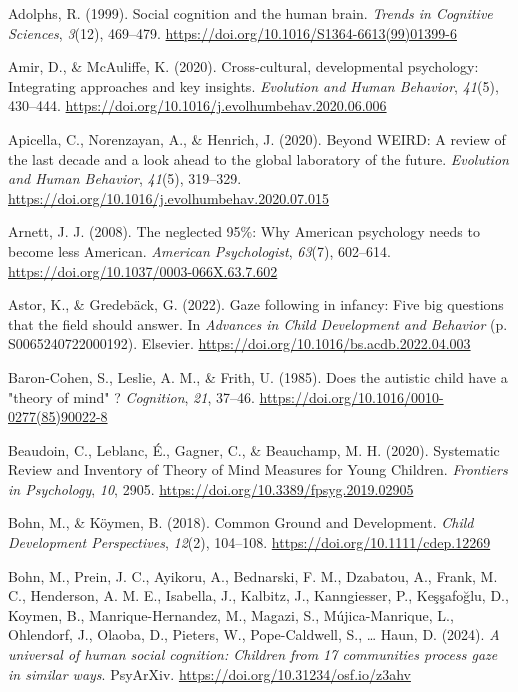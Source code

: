\documentclass[
  man,floatsintext]{apa7}
\newlength{\cslhangindent}
\newenvironment{CSLReferences}[2] %
 {\begin{list}{}{%
  \setlength{\itemindent}{0pt}
  \setlength{\leftmargin}{0pt}
  \setlength{\parsep}{0pt}
  \ifodd #1
   \setlength{\leftmargin}{\cslhangindent}
   \setlength{\itemindent}{-1\cslhangindent}
  \fi
  \setlength{\itemsep}{#2\baselineskip}}}
 {\end{list}}
\begin{document}
\label{refs}
\begin{CSLReferences}{1}{0}
Adolphs, R. (1999). Social cognition and the human brain. \emph{Trends in Cognitive Sciences}, \emph{3}(12), 469--479. \url{https://doi.org/10.1016/S1364-6613(99)01399-6}

Amir, D., \& McAuliffe, K. (2020). Cross-cultural, developmental psychology: Integrating approaches and key insights. \emph{Evolution and Human Behavior}, \emph{41}(5), 430--444. \url{https://doi.org/10.1016/j.evolhumbehav.2020.06.006}

Apicella, C., Norenzayan, A., \& Henrich, J. (2020). Beyond {WEIRD}: {A} review of the last decade and a look ahead to the global laboratory of the future. \emph{Evolution and Human Behavior}, \emph{41}(5), 319--329. \url{https://doi.org/10.1016/j.evolhumbehav.2020.07.015}

Arnett, J. J. (2008). The neglected 95\%: {Why American} psychology needs to become less {American}. \emph{American Psychologist}, \emph{63}(7), 602--614. \url{https://doi.org/10.1037/0003-066X.63.7.602}

Astor, K., \& Gredebäck, G. (2022). Gaze following in infancy: {Five} big questions that the field should answer. In \emph{Advances in {Child Development} and {Behavior}} (p. S0065240722000192). Elsevier. \url{https://doi.org/10.1016/bs.acdb.2022.04.003}

Baron-Cohen, S., Leslie, A. M., \& Frith, U. (1985). Does the autistic child have a "theory of mind" ? \emph{Cognition}, \emph{21}, 37--46. \url{https://doi.org/10.1016/0010-0277(85)90022-8}

Beaudoin, C., Leblanc, É., Gagner, C., \& Beauchamp, M. H. (2020). Systematic {Review} and {Inventory} of {Theory} of {Mind Measures} for {Young Children}. \emph{Frontiers in Psychology}, \emph{10}, 2905. \url{https://doi.org/10.3389/fpsyg.2019.02905}

Bohn, M., \& Köymen, B. (2018). Common {Ground} and {Development}. \emph{Child Development Perspectives}, \emph{12}(2), 104--108. \url{https://doi.org/10.1111/cdep.12269}

Bohn, M., Prein, J. C., Ayikoru, A., Bednarski, F. M., Dzabatou, A., Frank, M. C., Henderson, A. M. E., Isabella, J., Kalbitz, J., Kanngiesser, P., Keşşafoğlu, D., Koymen, B., Manrique-Hernandez, M., Magazi, S., Mújica-Manrique, L., Ohlendorf, J., Olaoba, D., Pieters, W., Pope-Caldwell, S., \ldots{} Haun, D. (2024). \emph{A universal of human social cognition: {Children} from 17 communities process gaze in similar ways}. PsyArXiv. \url{https://doi.org/10.31234/osf.io/z3ahv}


\end{CSLReferences}
\end{document}
